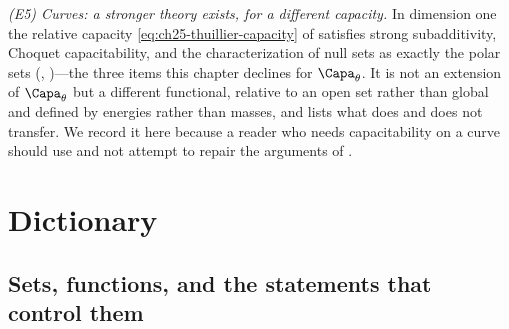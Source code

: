 \emph{(E5) Curves: a stronger theory exists, for a different capacity.}
In dimension one the relative capacity \eqref{eq:ch25-thuillier-capacity} of
\cite{Thu05} satisfies strong subadditivity, Choquet capacitability, and the
characterization of null sets as exactly the polar sets
(,
)---the three items this chapter declines for
$\Capa_\theta$.  It is not an extension of $\Capa_\theta$ but a different
functional, relative to an open set rather than global and defined by
energies rather than masses, and  lists what
does and does not transfer.  We record it here because a reader who needs
capacitability on a curve should use \cite{Thu05} and not attempt to repair
the arguments of .

\section{Dictionary}
\label{sec:ch25-dictionary}

\subsection{Sets, functions, and the statements that control them}
\label{sec:ch25-dict-objects}

